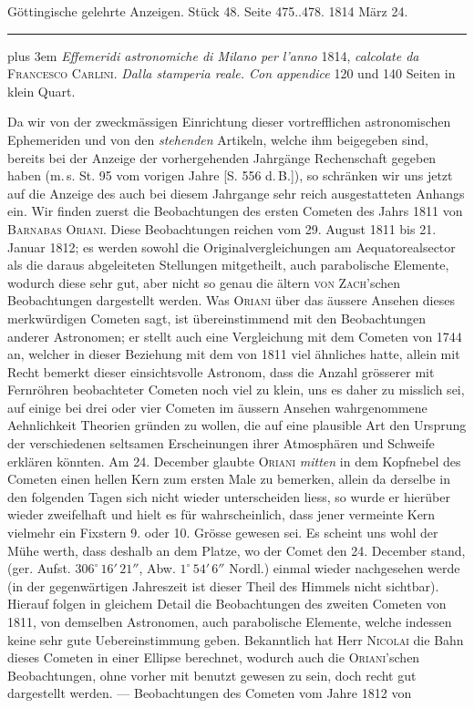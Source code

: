\clearpage
{}
\hypertarget{native-571-lower}{}
\begin{center}\small Göttingische gelehrte Anzeigen. Stück 48. Seite 475..478. 1814 März 24.\\[3pt]\rule{.72\linewidth}{.3pt}\end{center}

{\rightskip=0pt plus 3em \emph{Effemeridi astronomiche di Milano per l'anno} 1814, \emph{calcolate da} \textsc{Francesco Carlini}. \emph{Dalla stamperia reale. Con appendice} 120 und 140 Seiten in klein Quart.\par}

Da wir von der zweckmässigen Einrichtung dieser vortrefflichen astronomischen Ephemeriden und von den \emph{stehenden} Artikeln, welche ihm beigegeben sind, bereits bei der Anzeige der vorhergehenden Jahrgänge Rechenschaft gegeben haben (m.\,s. St. 95 vom vorigen Jahre [S. 556 d.\,B.]), so schränken wir uns jetzt auf die Anzeige des auch bei diesem Jahrgange sehr reich ausgestatteten Anhangs ein. Wir finden zuerst die Beobachtungen des ersten Cometen des Jahrs 1811 von \textsc{Barnabas Oriani}. Diese Beobachtungen reichen vom 29. August 1811 bis 21. Januar 1812; es werden sowohl die Originalvergleichungen am Aequatorealsector als die daraus abgeleiteten Stellungen mitgetheilt, auch parabolische Elemente, wodurch diese sehr gut, aber nicht so genau die ältern \textsc{von Zach}'schen Beobachtungen dargestellt werden. Was \textsc{Oriani} über das äussere Ansehen dieses merkwürdigen Cometen sagt, ist übereinstimmend mit den Beobachtungen anderer Astronomen; er stellt auch eine Vergleichung mit dem Cometen von 1744 an, welcher in dieser Beziehung mit dem von 1811 viel ähnliches hatte, allein mit Recht bemerkt dieser einsichtsvolle Astronom, dass die Anzahl grösserer mit Fernröhren beobachteter Cometen noch viel zu klein, uns es daher zu misslich sei, auf einige bei drei oder vier Cometen im äussern Ansehen wahrgenommene Aehnlichkeit Theorien gründen zu wollen, die auf eine plausible Art den Ursprung der verschiedenen seltsamen Erscheinungen ihrer Atmosphären und Schweife erklären könnten. Am 24. December glaubte \textsc{Oriani} \emph{mitten} in dem Kopfnebel des Cometen einen hellen Kern zum ersten Male zu bemerken, allein da derselbe in den folgenden Tagen sich nicht wieder unterscheiden liess, so wurde er hierüber wieder zweifelhaft und hielt es für wahrscheinlich, dass jener vermeinte Kern vielmehr ein Fixstern 9. oder 10. Grösse gewesen sei. Es scheint uns wohl der Mühe werth, dass deshalb an dem Platze, wo der Comet den 24. December stand, (ger. Aufst. $306^\circ\,16'\,21''$, Abw. $1^\circ\,54'\,6''$ Nordl.) einmal wieder nachgesehen werde (in der gegenwärtigen Jahreszeit ist dieser Theil des Himmels nicht sichtbar). Hierauf folgen in gleichem Detail die Beobachtungen des zweiten Cometen von 1811, von demselben Astronomen, auch parabolische Elemente, welche indessen keine sehr gute Uebereinstimmung geben. Bekanntlich hat Herr \textsc{Nicolai} die Bahn dieses Cometen in einer Ellipse berechnet, wodurch auch die \textsc{Oriani}'schen Beobachtungen, ohne vorher mit benutzt gewesen zu sein, doch recht gut dargestellt werden. --- Beobachtungen des Cometen vom Jahre 1812 von 
